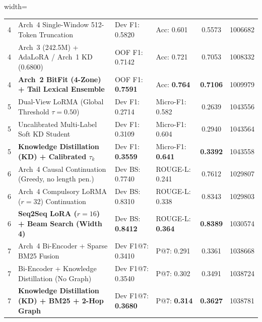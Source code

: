 \documentclass[11pt, oneside]{article}
\begin{document}
\begin{table}[t]
\begin{adjustbox}{width=\textwidth}
\begin{tabular}{@{}clllcc@{}}
4 & Arch~4 Single-Window 512-Token Truncation & Dev F1: 0.5820 & Acc: 0.601 & 0.5573 & 1006682 \\
4 & Arch~3 (242.5M) + AdaLoRA / Arch~1 KD (0.6800) & OOF F1: 0.7142 & Acc: 0.721 & 0.7053 & 1008332 \\
4 & \textbf{Arch~2 BitFit (4-Zone) + Tail Lexical Ensemble} & OOF F1: \textbf{0.7591} & Acc: \textbf{0.764} & \textbf{0.7106} & 1009979 \\
\midrule
5 & Dual-View LoRMA (Global Threshold $\tau=0.50$) & Dev F1: 0.2714 & Micro-F1: 0.582 & 0.2639 & 1043556 \\
5 & Uncalibrated Multi-Label Soft KD Student & Dev F1: 0.3109 & Micro-F1: 0.604 & 0.2940 & 1043564 \\
5 & \textbf{Knowledge Distillation (KD) + Calibrated $\tau_k$} & Dev F1: \textbf{0.3559} & Micro-F1: \textbf{0.641} & \textbf{0.3392} & 1043558 \\
\midrule
6 & Arch~4 Causal Continuation (Greedy, no length pen.) & Dev BS: 0.7740 & ROUGE-L: 0.241 & 0.7612 & 1029807 \\
6 & Arch~4 Compulsory LoRMA ($r=32$) Continuation & Dev BS: 0.8310 & ROUGE-L: 0.338 & 0.8343 & 1029803 \\
6 & \textbf{Seq2Seq LoRA ($r=16$) + Beam Search (Width 4)} & Dev BS: \textbf{0.8412} & ROUGE-L: \textbf{0.364} & \textbf{0.8389} & 1030574 \\
\midrule
7 & Arch~4 Bi-Encoder + Sparse BM25 Fusion & Dev F1@7: 0.3410 & P@7: 0.291 & 0.3361 & 1038668 \\
7 & Bi-Encoder + Knowledge Distillation (No Graph) & Dev F1@7: 0.3540 & P@7: 0.302 & 0.3491 & 1038724 \\
7 & \textbf{Knowledge Distillation (KD) + BM25 + 2-Hop Graph} & Dev F1@7: \textbf{0.3680} & P@7: \textbf{0.314} & \textbf{0.3627} & 1038781 \\
\bottomrule
\end{tabular}
\end{adjustbox}
\end{table}
\end{document}

